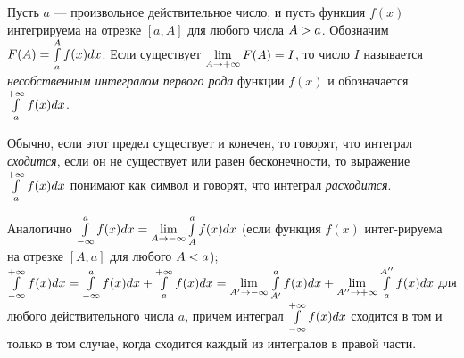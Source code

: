 \documentclass[a4paper,10pt]{article}
\begin{document}
	
	\jeolmnewheader
	
	\begin{defn}
		Пусть $a$ --- произвольное действительное число,
		 и пусть функция $f(x)$ интегрируема на отрезке $[a, A]$ для
		 любого числа $A \hm{>} a$. Обозначим $F(A) = \mathop{\int}\limits^A_a f(x)dx$.
		 Если существует $\liml_{A \to + \infty} F(A) \hm{=} I$, то число
		 $I$ называется \textit{несобственным интегралом первого рода}
		 функции $f(x)$ и обозначается $\mathop{\int}\limits^{+ \infty}_a f(x)dx$.
	\end{defn}
	
	\begin{note}
		Обычно, если этот предел существует и конечен, то говорят,
		 что интеграл \textit{сходится}, если он не существует или
		 равен бесконечности, то выражение $\mathop{\int}\limits^{+ \infty}_a
		 f(x)dx$ понимают как символ и говорят, что интеграл
		 \textit{расходится}.
	\end{note}

	\begin{text}
		Аналогично $\intl^a_{- \infty} f(x)dx \hm{=} \liml_{A \to - \infty}
		 \intl^a_A f(x)dx$ (если функция $f(x)$ интег-рируема на отрезке
		 $[A, a]$ для любого $A \hm{<} a$);\\
		 $\intl^{+ \infty}_{- \infty}
		 f(x)dx \hm{=} \intl^a_{- \infty} f(x)dx + \intl^{+ \infty}_a f(x)dx
		 \hm{=} \liml_{A' \to - \infty} \intl^a_{A'} f(x)dx + \liml_{A'' \to
		 + \infty} \intl^{A''}_a f(x)dx$ для любого действительного числа
		 $a$, причем интеграл $\mathop{\int}\limits^{+ \infty}_{- \infty} f(x)dx$
		 сходится в том и только в том случае, когда сходится каждый из
		 интегралов в правой части.
	\end{text}
	
\end{document}

